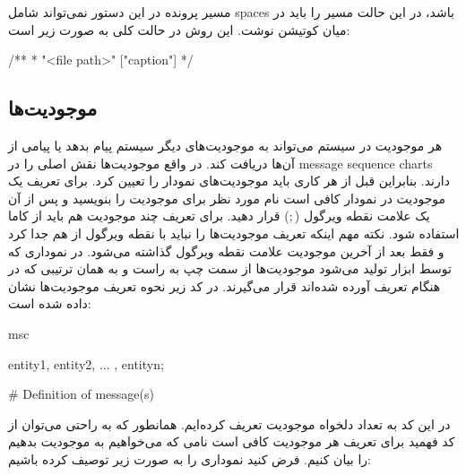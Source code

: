 \begin{note}
مسیر پرونده در این دستور نمی‌تواند شامل \glspl{space} باشد، در این حالت مسیر را
باید در میان کوتیشن نوشت. این روش در حالت کلی به صورت زیر است:
\begin{C++}
 /**
  * \mscfile "<file path>" ["caption"]
  */
\end{C++}
\end{note}



\subsection{موجودیت‌ها}


% 
% 

هر موجودیت در سیستم می‌تواند به موجودیت‌های دیگر سیستم پیام بدهد یا پیامی از
آن‌ها دریافت کند. در واقع موجودیت‌ها نقش اصلی را در \glspl{message sequence
chart} دارند. بنابراین قبل از هر کاری باید موجودیت‌های نمودار را تعیین کرد. برای
تعریف یک موجودیت در نمودار کافی است نام مورد نظر برای موجودیت را بنویسید و پس از
آن یک علامت نقطه ویرگول ($;$) قرار دهید. برای تعریف چند موجودیت هم باید از کاما
استفاده شود. نکته مهم اینکه تعریف موجودیت‌ها را نباید با نقطه ویرگول از هم جدا
کرد و فقط بعد از آخرین موجودیت علامت نقطه ویرگول گذاشته می‌شود. در نموداری که
توسط ابزار  تولید می‌شود موجودیت‌ها از سمت چپ به راست و به همان
ترتیبی که در هنگام تعریف آورده شده‌اند قرار می‌گیرند. در کد زیر نحوه تعریف
موجودیت‌ها نشان داده شده است:

\begin{MSC}
msc {
	entity1, entity2, ... ,	entityn;
	
	# Definition of message(s)
	
}
\end{MSC}

در این کد به تعداد دلخواه موجودیت تعریف کرده‌ایم. همانطور که به راحتی می‌توان از
کد فهمید برای تعریف هر موجودیت کافی است نامی که می‌خواهیم به موجودیت بدهیم را
بیان کنیم. فرض کنید نموداری را به صورت زیر توصیف کرده باشیم:

